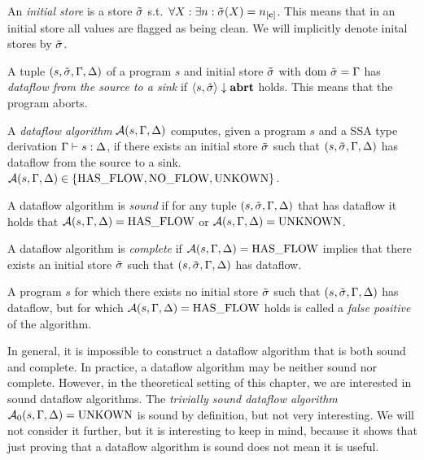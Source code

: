 \begin{definition}
    An \emph{initial store} is a store $\tilde{\sigma}$ s.t.\ 
    $\forall X: \exists n: \initialstore(X) = \clean[n]$.
    This means that in an initial store all values are flagged as being clean.
    We will implicitly denote inital stores by $\tilde{\sigma}$.
\end{definition}

\begin{definition}[Dataflow]
    A tuple $(s, \tilde{\sigma}, \Gamma, \Delta)$ of a program $s$ and initial store $\tilde{\sigma}{}$ 
    with $\text{dom }{\tilde{\sigma}{}} = \Gamma$
    has \emph{dataflow from the source to a sink} if
    $\langle s, \tilde{\sigma}{} \rangle \downarrow \textbf{abrt}$ holds.
    This means that the program aborts.
\end{definition}

\begin{definition}
    A \emph{dataflow algorithm} $\operatorname{\mathcal{A}}(s, \Gamma, \Delta)$ computes, given a program $s$
    and a SSA type derivation $\Gamma \vdash {s}: \Delta$,
    if there exists an initial store $\tilde{\sigma}{}$ 
    such that $(s, \tilde{\sigma}, \Gamma, \Delta)$ has dataflow from the source to a sink.
    $\operatorname{\mathcal{A}}(s, \Gamma, \Delta) \in \{\text{HAS\_FLOW}, \text{NO\_FLOW}, \text{UNKOWN}\}$.
\end{definition}

\begin{definition}[Soundness]
    A dataflow algorithm is \emph{sound} if for any tuple $(s, \tilde{\sigma}, \Gamma, \Delta)$ that
    has dataflow it holds that $\operatorname{\mathcal{A}}(s, \Gamma, \Delta) = \text{HAS\_FLOW}$ or
    $\operatorname{\mathcal{A}}(s, \Gamma, \Delta) = \text{UNKNOWN}$.
\end{definition}

\begin{definition}[Completeness]
    A dataflow algorithm is \emph{complete} if $\operatorname{\mathcal{A}}(s, \Gamma, \Delta) = \text{HAS\_FLOW}$
    implies that there exists an initial store $\tilde{\sigma}$
     such that $(s, \tilde{\sigma}, \Gamma, \Delta)$ has dataflow.
\end{definition}
\begin{definition}
    A program $s$ for which there exists no initial store $\tilde{\sigma}$ such that 
    $(s, \tilde{\sigma}, \Gamma, \Delta)$ has dataflow, but for which $\operatorname{\mathcal{A}}(s, \Gamma, \Delta) = \text{HAS\_FLOW}$ holds
    is called a \emph{false positive} of the algorithm.
\end{definition}
\begin{remark}
    In general, it is impossible to construct a dataflow algorithm that is both 
    sound and complete.
    In practice, a dataflow algorithm may be neither sound nor complete.
    However, in the theoretical setting of this chapter, we are interested in 
    sound dataflow algorithms.
    The \emph{trivially sound dataflow algorithm} $\operatorname{\mathcal{A}}_0(s, \Gamma, \Delta) = \text{UNKOWN}$ 
    is sound by definition, but not very interesting.
    We will not consider it further, but it is interesting to keep in mind,
    because it shows that just proving that a dataflow algorithm is sound does not
    mean it is useful.    
\end{remark}

